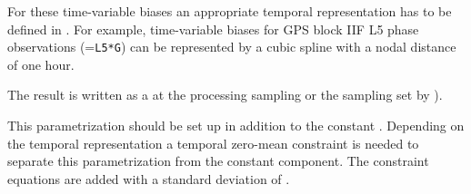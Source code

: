 For these time-variable biases an appropriate temporal representation has to be defined in
.
For example, time-variable biases for GPS block IIF L5 phase observations (=\verb|L5*G|)
can be represented by a cubic spline with a nodal distance of one hour.

The result is written as a  at the processing sampling
or the sampling set by ).

This parametrization should be set up in addition to the constant
.
Depending on the temporal representation a temporal zero-mean constraint is needed
to separate this parametrization from the constant component. The constraint equations are added with
a standard deviation of .


